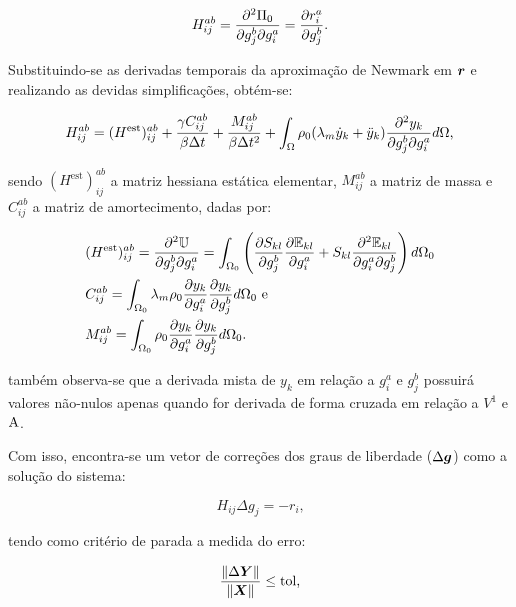 \begin{equation}
    H_{ij}^{ab}=\frac{\partial^2\Pi_0}{\partial g_j^b\partial g_i^a}=\frac{\partial{r_i^a}}{\partial{g_j^b}}\text{.}
\end{equation}

Substituindo-se as derivadas temporais da aproximação de Newmark em $\boldsymbol{r}$ e realizando as devidas simplificações, obtém-se:

\begin{equation}
    H_{ij}^{ab}=(H^\text{est})_{ij}^{ab}+\frac{\gamma C_{ij}^{ab}}{\beta\Delta t}+\frac{M_{ij}^{ab}}{\beta\Delta t^2}+\int_{\Omega}{\rho_0(\lambda_m\dot{y}_k+\ddot{y}_k)\frac{\partial^2{y_k}}{\partial{g_j^b}\partial{g_i^a}} d\Omega}\text{,}
    \label{eq:CSD-Hijab}
\end{equation}

\noindent sendo $(H^\text{est})_{ij}^{ab}$ a matriz hessiana estática elementar, $M_{ij}^{ab}$ a matriz de massa e $C_{ij}^{ab}$ a matriz de amortecimento, dadas por:

\begin{subequations}
    \begin{align}
         & (H^\text{est})_{ij}^{ab}=\frac{\partial^2{\mathbb{U}}}{\partial{g_j^b}\partial{g_i^a}}=\int_{\Omega_0}{\left({\frac{\partial{S_{kl}}}{\partial{g_j^b}}\frac{\partial{\mathbb{E}_{kl}}}{\partial{g_i^a}}+S_{kl}\frac{\partial^2{\mathbb{E}_{kl}}}{\partial{g_i^a}\partial{g_j^b}}}\right) d\Omega_0} \\
         & C_{ij}^{ab}=\int_{\Omega_0}{\lambda_m\rho_0\frac{\partial{y_k}}{\partial{g_i^a}}\frac{\partial{y_k}}{\partial{g_j^b}} d\Omega_0}\text{ e}                                                                                         \\
         & M_{ij}^{ab}=\int_{\Omega_0}{\rho_0\frac{\partial{y_k}}{\partial{g_i^a}}\frac{\partial{y_k}}{\partial{g_j^b}} d\Omega_0}\text{.}
    \end{align}
    \label{eq:CSD-HMC}
\end{subequations}

\noindent também observa-se que a derivada mista de $y_k$ em relação a $g_i^a$ e $g_j^b$ possuirá valores não-nulos apenas quando for derivada de forma cruzada em relação a $V^1$ e $\mathrm{A}$.

Com isso, encontra-se um vetor de correções dos graus de liberdade ($\Delta\boldsymbol{g}$) como a solução do sistema:

\begin{equation}
    H_{ij}\Delta g_j=-r_i\text{,}
\end{equation}

\noindent tendo como critério de parada a medida do erro:

\begin{equation}
    \frac{\left\lVert{\Delta\boldsymbol{Y}}\right\lVert}{\left\lVert{\boldsymbol{X}}\right\lVert}\leq\text{tol,}
    \label{eq:CSD-erro}
\end{equation}

